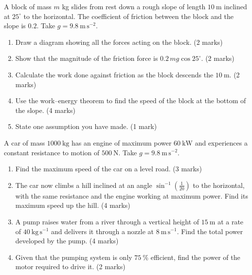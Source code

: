 \documentclass[11pt]{article}
\begin{document}
\begin{exercice}
A block of mass $m$ kg slides from rest down a rough slope of length $10\ \mathrm{m}$ inclined at $25^{\circ}$ to the horizontal. The coefficient of friction between the block and the slope is $0.2$. Take $g = 9.8\ \mathrm{m\,s^{-2}}$.
\begin{enumerate}
\item Draw a diagram showing all the forces acting on the block. \hfill (2 marks)
\item Show that the magnitude of the friction force is $0.2\,mg\cos 25^{\circ}$. \hfill (2 marks)
\item Calculate the work done against friction as the block descends the $10\ \mathrm{m}$. \hfill (2 marks)
\item Use the work--energy theorem to find the speed of the block at the bottom of the slope. \hfill (4 marks)
\item State one assumption you have made. \hfill (1 mark)
\end{enumerate}
\end{exercice}

\begin{exercice}
A car of mass $1000\ \mathrm{kg}$ has an engine of maximum power $60\ \mathrm{kW}$ and experiences a constant resistance to motion of $500\ \mathrm{N}$. Take $g = 9.8\ \mathrm{m\,s^{-2}}$.
\begin{enumerate}
\item Find the maximum speed of the car on a level road. \hfill (3 marks)
\item The car now climbs a hill inclined at an angle $\sin^{-1}\!\left(\tfrac{1}{20}\right)$ to the horizontal, with the same resistance and the engine working at maximum power. Find its maximum speed up the hill. \hfill (4 marks)
\item A pump raises water from a river through a vertical height of $15\ \mathrm{m}$ at a rate of $40\ \mathrm{kg\,s^{-1}}$ and delivers it through a nozzle at $8\ \mathrm{m\,s^{-1}}$. Find the total power developed by the pump. \hfill (4 marks)
\item Given that the pumping system is only $75\ \%$ efficient, find the power of the motor required to drive it. \hfill (2 marks)
\end{enumerate}
\end{exercice}
\end{document}
